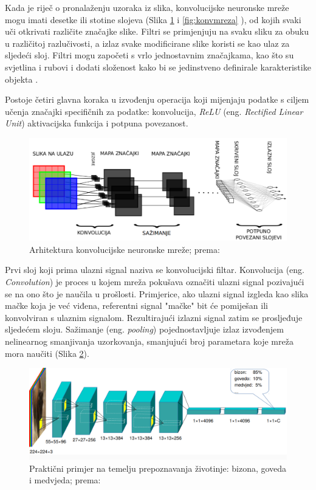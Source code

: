 \documentclass[]{foi} %
\begin{document}
Kada je riječ o pronalaženju uzoraka iz slika, konvolucijske neuronske mreže mogu imati desetke ili stotine slojeva (Slika \ref{fig:konvolucija} i \ref{fig:konvmreza} ), od kojih svaki uči otkrivati različite značajke slike. Filtri se primjenjuju na svaku sliku za obuku u različitoj razlučivosti, a izlaz svake modificirane slike koristi se kao ulaz za sljedeći sloj. Filtri mogu započeti s vrlo jednostavnim značajkama, kao što su svjetlina i rubovi i dodati složenost kako bi se jedinstveno definirale karakteristike objekta \cite[str. 90]{fundamentals}.

Postoje četiri glavna koraka \cite{konv} u izvođenju operacija koji mijenjaju podatke s ciljem učenja značajki specifičnih za podatke: konvolucija, \textit{ReLU} (eng. \textit{Rectified Linear Unit}) aktivacijska funkcija i potpuna povezanost. 

\begin{figure}[!ht]
    \centering
    \includegraphics[width=1\textwidth]{slike/konvolucija.png}
    \caption{Arhitektura konvolucijske neuronske mreže; prema: \cite{builtin1}}
    \label{fig:konvolucija}
\end{figure}

Prvi sloj koji prima ulazni signal naziva se konvolucijski filtar. Konvolucija (eng. \textit{Convolution}) \cite[str. 327]{deep} je proces u kojem mreža pokušava označiti ulazni signal pozivajući se na ono što je naučila u prošlosti. Primjerice, ako ulazni signal izgleda kao slika mačke koja je već viđena, referentni signal "mačke" bit će pomiješan ili konvolviran s ulaznim signalom. Rezultirajući izlazni signal zatim se prosljeđuje sljedećem sloju.
Sažimanje (eng. \textit{pooling}) \cite{konv} pojednostavljuje izlaz izvođenjem nelinearnog smanjivanja uzorkovanja, smanjujući broj parametara koje mreža mora naučiti (Slika \ref{fig:primjer}).

\begin{figure}[!ht]
    \centering
    \includegraphics[width=1\textwidth]{slike/primjer.png}
    \caption{Praktični primjer na temelju prepoznavanja životinje: bizona, goveda i medvjeda; prema: \cite{konv}}
    \label{fig:primjer}
\end{figure}
\end{document}
